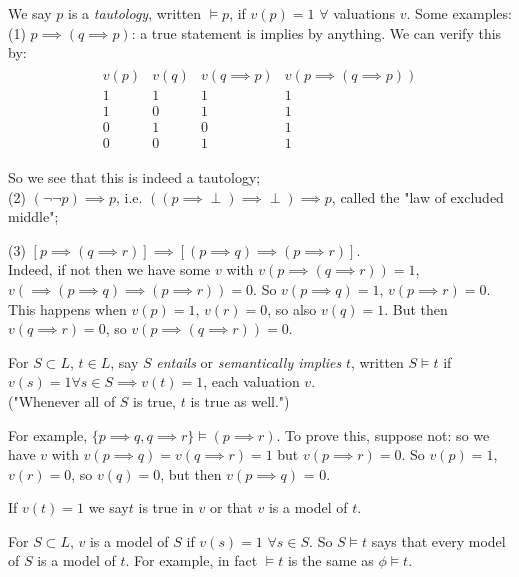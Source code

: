 \documentclass[a4paper]{article}
\begin{document}
\begin{defi}
We say $p$ is a \emph{tautology}, written $\vDash p$, if $v(p) = 1$ $\forall$ valuations $v$. Some examples:\\
(1) $p \implies (q \implies p)$: a true statement is implies by anything. We can verify this by:
\begin{equation*}
\begin{aligned}
\begin{matrix}
v(p) & v(q) & v(q \implies p) & v(p \implies (q \implies p))\\
1 & 1 & 1 & 1\\
1 & 0 & 1 & 1\\
0 & 1 & 0 & 1\\
0 & 0 & 1 & 1
\end{matrix}
\end{aligned}
\end{equation*}

So we see that this is indeed a tautology;\\
(2) $(\neg\neg p) \implies p$, i.e. $((p \implies \perp) \implies \perp) \implies p$, called the "law of excluded middle";

(3) $[p \implies (q \implies r)] \implies [(p \implies q) \implies (p \implies r)]$.\\
Indeed, if not then we have some $v$ with $v(p\implies(q \implies r)) = 1$, $v(\implies (p \implies q) \implies (p \implies r)) = 0$. So $v(p\implies q) = 1$, $v(p \implies r) =0$. This happens when $v(p) = 1$, $v(r) = 0$, so also $v(q) = 1$. But then $v(q \implies r)=0$, so $v(p \implies (q \implies r)) = 0$.
\end{defi}

\begin{defi}
For $S \subset L$, $t \in L$, say $S$ \emph{entails} or \emph{semantically implies} $t$, written $S \vDash t$ if $v(s) = 1 \forall s \in S \implies v(t) = 1$, each valuation $v$.\\
("Whenever all of $S$ is true, $t$ is true as well.")

For example, $\{p \implies q, q \implies r\} \vDash (p \implies r)$. To prove this, suppose not: so we have $v$ with $v(p\implies q) = v(q\implies r) = 1$ but $v(p\implies r) = 0$. So $v(p) = 1$, $v(r) = 0$, so $v(q) = 0$, but then $v(p \implies q)$ = 0.

If $v(t) = 1$ we say$t$ is true in $v$ or that $v$ is a model of $t$.

For $S \subset L$, $v$ is a model of $S$ if $v(s) = 1$ $\forall s \in S$. So $S \vDash t$ says that every model of $S$ is a model of $t$. For example, in fact $\vDash t$ is the same as $\phi \vDash t$.
\end{defi}
\end{document}
